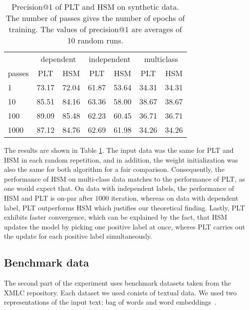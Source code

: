 \documentclass{article}
\newcommand{\Algo}[1]{\textsc{#1}}
\begin{document}
\begin{table}[]
	\centering
	\caption{Precision@1 of PLT and HSM on synthetic data. The number of passes gives the number of epochs of training. The values of precision@1 are averages of 10 random runs.}
	\label{tab:synthetic1}
\begin{tabular}{l|rr|rr|rr}
	\toprule
	 & \multicolumn{2}{c|}{dependent}                     & \multicolumn{2}{c|}{independent}                   & \multicolumn{2}{c}{multiclass}                    \\
	 passes & \multicolumn{1}{c}{PLT} & \multicolumn{1}{c|}{HSM} & \multicolumn{1}{c}{PLT} & \multicolumn{1}{c|}{HSM} & \multicolumn{1}{c}{PLT} & \multicolumn{1}{c}{HSM} \\
	\midrule
	1      & 73.17 & 72.04 & 61.87    & 53.64 & 34.31  & 34.31  \\
	10     & 85.51 & 84.16 & 63.36    & 58.00 & 38.67  & 38.67  \\
	100    & 89.09 & 85.48 & 62.23    & 60.45 & 36.71  & 36.71  \\
	1000   & 87.12 & 84.76 & 62.69    & 61.98 & 34.26  & 34.26 \\
	\bottomrule
\end{tabular}
\end{table}


The results are shown in Table \ref{tab:synthetic1}. The input data was the same for \Algo{PLT} and \Algo{HSM} in each random repetition, and in addition, the weight initialization was also the same for both algorithm for a fair comparison. Consequently, the performance of \Algo{HSM} on multi-class data matches to the performance of \Algo{PLT}, as one would expect that. On data with independent labels, the performance of \Algo{HSM} and \Algo{PLT} is on-par after $1000$ iteration, whereas on data with dependent label, \Algo{PLT} outperforms \Algo{HSM} which justifies our theoretical finding. Lastly, \Algo{PLT} exhibits faster convergence, which can be explained by the fact, that \Algo{HSM} updates the model by picking one positive label at once, wheres \Algo{PLT}  carries out the update for each positive label simultaneously.



\subsection{Benchmark data}

The second part of the experiment uses benchmark datasets taken from the XMLC repository. Each dataset we used conists of textual data. We used two representations of the input text: bag of words and word embeddings~\citep{Mikolov}. 
\end{document}

